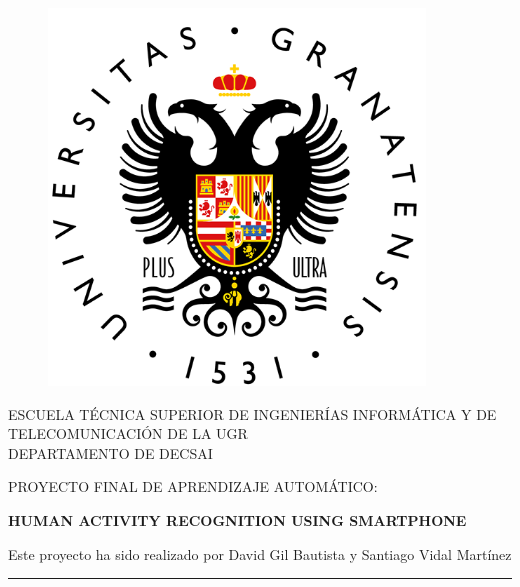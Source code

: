 \documentclass[a4paper,openright,12pt]{report}
\begin{document}
\begin{titlepage}

\begin{center}
\vspace*{-1in}
\begin{figure}[htb]
\begin{center}
\includegraphics[width=10cm]{logo.png}
\end{center}
\end{figure}

ESCUELA TÉCNICA SUPERIOR DE INGENIERÍAS INFORMÁTICA Y DE TELECOMUNICACIÓN DE LA UGR\\
\vspace*{0.15in}
DEPARTAMENTO DE DECSAI \\
\vspace*{0.6in}

\begin{large}
PROYECTO FINAL DE APRENDIZAJE AUTOMÁTICO:\\
\end{large}
\vspace*{0.2in}
\begin{Large}
\textbf{HUMAN ACTIVITY RECOGNITION USING SMARTPHONE} \\
\end{Large}
\vspace*{0.3in}
\begin{large}
Este proyecto ha sido realizado por David Gil Bautista y Santiago Vidal Martínez\\
\end{large}
\vspace*{0.3in}
\rule{80mm}{0.1mm}\\
\vspace*{0.1in}
\end{center}

\end{titlepage}
\end{document}
